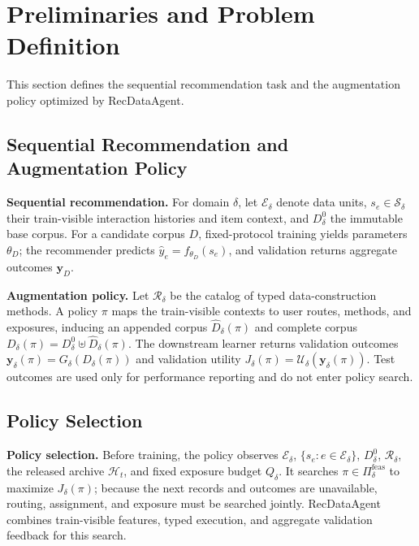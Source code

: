 \section{Preliminaries and Problem Definition}
\label{sec:problem-definition-section}

This section defines the sequential recommendation task and the augmentation policy optimized by RecDataAgent.

\subsection{Sequential Recommendation and Augmentation Policy}
\label{sec:problem-definition}

\textbf{Sequential recommendation.} For domain $\delta$, let $\mathcal{E}_{\delta}$ denote data units, $s_e\in\mathcal{S}_{\delta}$ their train-visible interaction histories and item context, and $D^0_{\delta}$ the immutable base corpus. For a candidate corpus $D$, fixed-protocol training yields parameters $\theta_D$; the recommender predicts $\widehat y_e=f_{\theta_D}(s_e)$, and validation returns aggregate outcomes $\mathbf{y}_D$.

\textbf{Augmentation policy.} Let $\mathcal{R}_{\delta}$ be the catalog of typed data-construction methods. A policy $\pi$ maps the train-visible contexts to user routes, methods, and exposures, inducing an appended corpus $\widehat D_{\delta}(\pi)$ and complete corpus $D_{\delta}(\pi)=D^0_{\delta}\mathbin{\uplus}\widehat D_{\delta}(\pi)$. The downstream learner returns validation outcomes $\mathbf{y}_{\delta}(\pi)=G_{\delta}(D_{\delta}(\pi))$ and validation utility $J_{\delta}(\pi)=\mathcal{U}_{\delta}(\mathbf{y}_{\delta}(\pi))$. Test outcomes are used only for performance reporting and do not enter policy search.

\subsection{Policy Selection}
\label{sec:data-policy-selection}

\textbf{Policy selection.} Before training, the policy observes $\mathcal{E}_{\delta}$, $\{s_e:e\in\mathcal{E}_{\delta}\}$, $D^0_{\delta}$, $\mathcal{R}_{\delta}$, the released archive $\mathcal{H}_{t}$, and fixed exposure budget $Q_{\delta}$. It searches $\pi\in\Pi_{\delta}^{\mathrm{feas}}$ to maximize $J_{\delta}(\pi)$; because the next records and outcomes are unavailable, routing, assignment, and exposure must be searched jointly. RecDataAgent combines train-visible features, typed execution, and aggregate validation feedback for this search.

